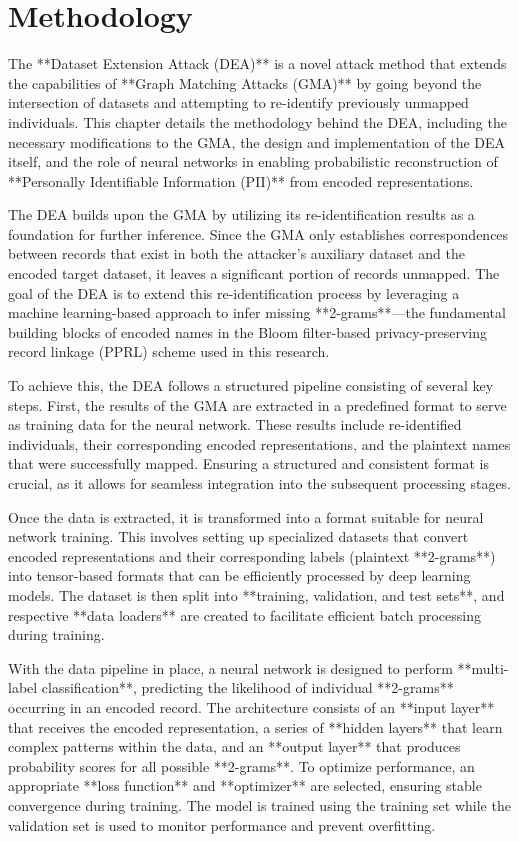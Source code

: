 \chapter{Methodology}  \label{sec:method}
The **Dataset Extension Attack (DEA)** is a novel attack method that extends the capabilities of **Graph Matching Attacks (GMA)** by going beyond the intersection of datasets and attempting to re-identify previously unmapped individuals. This chapter details the methodology behind the DEA, including the necessary modifications to the GMA, the design and implementation of the DEA itself, and the role of neural networks in enabling probabilistic reconstruction of **Personally Identifiable Information (PII)** from encoded representations.

The DEA builds upon the GMA by utilizing its re-identification results as a foundation for further inference. Since the GMA only establishes correspondences between records that exist in both the attacker’s auxiliary dataset and the encoded target dataset, it leaves a significant portion of records unmapped. The goal of the DEA is to extend this re-identification process by leveraging a machine learning-based approach to infer missing **2-grams**—the fundamental building blocks of encoded names in the Bloom filter-based privacy-preserving record linkage (PPRL) scheme used in this research.

To achieve this, the DEA follows a structured pipeline consisting of several key steps. First, the results of the GMA are extracted in a predefined format to serve as training data for the neural network. These results include re-identified individuals, their corresponding encoded representations, and the plaintext names that were successfully mapped. Ensuring a structured and consistent format is crucial, as it allows for seamless integration into the subsequent processing stages.

Once the data is extracted, it is transformed into a format suitable for neural network training. This involves setting up specialized datasets that convert encoded representations and their corresponding labels (plaintext **2-grams**) into tensor-based formats that can be efficiently processed by deep learning models. The dataset is then split into **training, validation, and test sets**, and respective **data loaders** are created to facilitate efficient batch processing during training.

With the data pipeline in place, a neural network is designed to perform **multi-label classification**, predicting the likelihood of individual **2-grams** occurring in an encoded record. The architecture consists of an **input layer** that receives the encoded representation, a series of **hidden layers** that learn complex patterns within the data, and an **output layer** that produces probability scores for all possible **2-grams**. To optimize performance, an appropriate **loss function** and **optimizer** are selected, ensuring stable convergence during training. The model is trained using the training set while the validation set is used to monitor performance and prevent overfitting.

